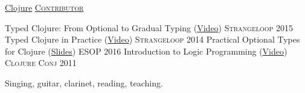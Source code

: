 \documentclass[10pt,a4paper]{article}
\begin{document}
\headedsection
  {\href{https://github.com/clojure/clojure}{Clojure}}
  {\href{https://github.com/clojure/clojure/commits?author=frenchy64}{\textsc{Contributor}}} {%
    {
    }
}


\headedsection
  {Typed Clojure: From Optional to Gradual Typing (\href{https://www.youtube.com/watch?v=yG9CffLlXx0}{Video})}
  {\textsc{Strangeloop 2015}} {%
}
\headedsection
  {Typed Clojure in Practice (\href{https://www.youtube.com/watch?v=a0gT0syAXsY}{Video})}
  {\textsc{Strangeloop 2014}} {%
}
\headedsection
  {Practical Optional Types for Clojure (\href{http://ambrosebs.com/talks/esop16.pdf}{Slides})}
  {\textsc{ESOP 2016}} {%
  }
\headedsection
  {Introduction to Logic Programming (\href{https://www.youtube.com/watch?v=irjP8BO1B8Y}{Video})}
  {\textsc{Clojure Conj 2011}} {%
}


\inlineheadsection
  {Singing, guitar, clarinet, reading, teaching.}
\end{document}
